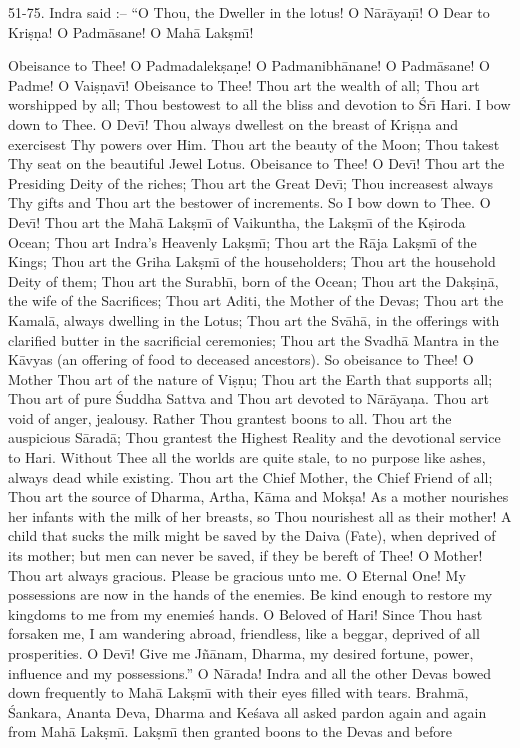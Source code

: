 51-75. Indra said :-- ``O Thou, the Dweller in the lotus! O N\=ar\=aya\d{n}\={\i}! O Dear to Kri\d{s}\d{n}a! O Padm\=asane! O Mah\=a Lak\d{s}m\={\i}!

Obeisance to Thee! O Padmadalek\d{s}a\d{n}e! O Padmanibh\=anane! O Padm\=asane! O Padme! O Vai\d{s}\d{n}av\={\i}! Obeisance to Thee! Thou art the wealth of all; Thou art worshipped by all; Thou bestowest to all the bliss and devotion to \'Sr\={\i} Hari. I bow down to Thee. O Dev\={\i}! Thou always dwellest on the breast of Kri\d{s}\d{n}a and exercisest Thy powers over Him. Thou art the beauty of the Moon; Thou takest Thy seat on the beautiful Jewel Lotus. Obeisance to Thee! O Dev\={\i}! Thou art the Presiding Deity of the riches; Thou art the Great Dev\={\i}; Thou increasest always Thy gifts and Thou art the bestower of increments. So I bow down to Thee. O Dev\={\i}! Thou art the Mah\=a Lak\d{s}m\={\i} of Vaikuntha, the Lak\d{s}m\={\i} of the K\d{s}iroda Ocean; Thou art Indra's Heavenly Lak\d{s}m\={\i}; Thou art the R\=aja Lak\d{s}m\={\i} of the Kings; Thou art the Griha Lak\d{s}m\={\i} of the householders; Thou art the household Deity of them; Thou art the Surabh\={\i}, born of the Ocean; Thou art the Dak\d{s}i\d{n}\=a, the wife of the Sacrifices; Thou art Aditi, the Mother of the Devas; Thou art the Kamal\=a, always dwelling in the Lotus; Thou art the Sv\=ah\=a, in the offerings with clarified butter in the sacrificial ceremonies; Thou art the Svadh\=a Mantra in the K\=avyas (an offering of food to deceased ancestors). So obeisance to Thee! O Mother Thou art of the nature of Vi\d{s}\d{n}u; Thou art the Earth that supports all; Thou art of pure \'Suddha Sattva and Thou art devoted to N\=ar\=aya\d{n}a. Thou art void of anger, jealousy. Rather Thou grantest boons to all. Thou art the auspicious S\=arad\=a; Thou grantest the Highest Reality and the devotional service to Hari. Without Thee all the worlds are quite stale, to no purpose like ashes, always dead while existing. Thou art the Chief Mother, the Chief Friend of all; Thou art the source of Dharma, Artha, K\=ama and Mok\d{s}a! As a mother nourishes her infants with the milk of her breasts, so Thou nourishest all as their mother! A child that sucks the milk might be saved by the Daiva (Fate), when deprived of its mother; but men can never be saved, if they be bereft of Thee! O Mother! Thou art always gracious. Please be gracious unto me. O Eternal One! My possessions are now in the hands of the enemies. Be kind enough to restore my kingdoms to me from my enemie\'s hands. O Beloved of Hari! Since Thou hast forsaken me, I am wandering abroad, friendless, like a beggar, deprived of all prosperities. O Dev\={\i}! Give me J\~n\=anam, Dharma, my desired fortune, power, influence and my possessions.'' O N\=arada! Indra and all the other Devas bowed down frequently to Mah\=a Lak\d{s}m\={\i} with their eyes filled with tears. Brahm\=a, \'Sankara, Ananta Deva, Dharma and Ke\'sava all asked pardon again and again from Mah\=a Lak\d{s}m\={\i}. Lak\d{s}m\={\i} then granted boons to the Devas and before


